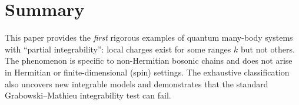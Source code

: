 \documentclass[11pt,a4paper]{article}
\begin{document}
\section*{Summary}

This paper provides the \emph{first} rigorous examples of quantum many-body systems with ``partial integrability'': local charges exist for some ranges $k$ but not others. The phenomenon is specific to non-Hermitian bosonic chains and does not arise in Hermitian or finite-dimensional (spin) settings. The exhaustive classification also uncovers new integrable models and demonstrates that the standard Grabowski--Mathieu integrability test can fail.
\end{document}
